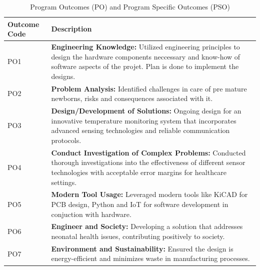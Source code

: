 \documentclass{article}
\begin{document}
\begin{table}[ht]
    \centering
    \caption{Program Outcomes (PO) and Program Specific Outcomes (PSO)}
    \begin{tabular}{@{}ll@{}}
        \toprule
        \textbf{Outcome Code} & \textbf{Description} \\ \midrule
        PO1  & \begin{minipage}[t]{10cm} \textbf{Engineering Knowledge:} Utilized engineering principles to design the hardware components neccessary and know-how of software aspects of the projet. Plan is done to implement the designs. \end{minipage} \\
        PO2  & \begin{minipage}[t]{10cm} \textbf{Problem Analysis:} Identified challenges in care of pre mature newborns, risks and consequences associated with it. \end{minipage} \\
        PO3  & \begin{minipage}[t]{10cm} \textbf{Design/Development of Solutions:} Ongoing design for an innovative temperature monitoring system that incorporates advanced sensing technologies and reliable communication protocols. \end{minipage} \\
        PO4  & \begin{minipage}[t]{10cm} \textbf{Conduct Investigation of Complex Problems:} Conducted thorough investigations into the effectiveness of different sensor technologies with acceptable error margins for healthcare settings. \end{minipage} \\
        PO5  & \begin{minipage}[t]{10cm} \textbf{Modern Tool Usage:} Leveraged modern tools like KiCAD for PCB design, Python and IoT for software development in conjuction with hardware. \end{minipage} \\
        PO6  & \begin{minipage}[t]{10cm} \textbf{Engineer and Society:} Developing a solution that addresses neonatal health issues, contributing positively to society. \end{minipage} \\
        PO7  & \begin{minipage}[t]{10cm} \textbf{Environment and Sustainability:} Ensured the design is energy-efficient and minimizes waste in manufacturing processes. \end{minipage} \\

\end{tabular}
\end{table}
\end{document}
